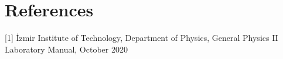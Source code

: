 \section{References}

[1] İzmir Institute of Technology, Department of Physics, General Physics II Laboratory Manual, October 2020